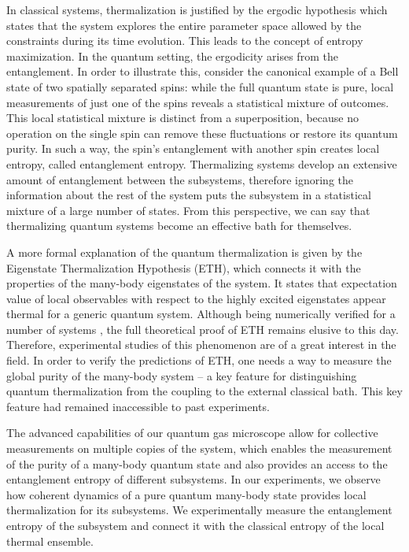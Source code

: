 In classical systems, thermalization is justified by the ergodic hypothesis which states that the system explores the entire parameter space allowed by the constraints during its time evolution. This leads to the concept of entropy maximization. In the quantum setting, the ergodicity arises from the entanglement. In order to illustrate this, consider the canonical example of a Bell state of two spatially separated spins: while the full quantum state is pure, local measurements of just one of the spins reveals a statistical mixture of outcomes. This local statistical mixture is distinct from a superposition, because no operation on the single spin can remove these fluctuations or restore its quantum purity. In such a way, the spin's entanglement with another spin creates local entropy, called entanglement entropy. Thermalizing systems develop an extensive amount of entanglement between the subsystems, therefore ignoring the information about the rest of the system puts the subsystem in a statistical mixture of a large number of states. From this perspective, we can say that thermalizing quantum systems become an effective bath for themselves.

A more formal explanation of the quantum thermalization is given by the Eigenstate Thermalization Hypothesis (ETH), which connects it with the properties of the many-body eigenstates of the system. It states that expectation value of local observables with respect to the highly excited eigenstates appear thermal for a generic quantum system. Although being numerically verified for a number of systems \cite{ Rigol2008, Santos2012, Dalessio2016, Alba2015}, the full theoretical proof of ETH remains elusive to this day. Therefore, experimental studies of this phenomenon are of a great interest in the field. In order to verify the predictions of ETH, one needs a way to measure the global purity of the many-body system -- a key feature for distinguishing quantum thermalization from the coupling to the external classical bath. This key feature had remained inaccessible to past experiments.

The advanced capabilities of our quantum gas microscope allow for collective measurements on multiple copies of the system, which enables the measurement of the purity of a many-body quantum state and also provides an access to the entanglement entropy of different subsystems. In our experiments, we observe how coherent dynamics of a pure quantum many-body state provides local thermalization for its subsystems. We experimentally measure the entanglement entropy of the subsystem and connect it with the classical entropy of the local thermal ensemble.

